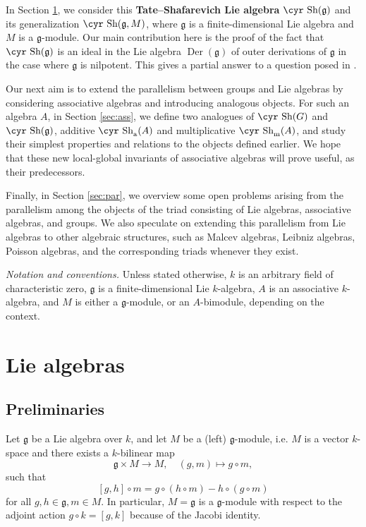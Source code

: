 \documentclass[11pt,reqno]{amsart}
\numberwithin{equation}{section}
\theoremstyle{definition}
\newcommand{\Der}{{\operatorname{ Der}}}
\def\Sha{\text{\cyr Sh}}
\def\g{\mathfrak g}
\begin{document}
In Section \ref{sec:lie}, we consider this {\bf Tate--Shafarevich Lie algebra} $\Sha (\g)$ and its generalization
$\Sha (\g,M)$, where $\g$ is a finite-dimensional Lie algebra and $M$ is a $\g$-module. Our main contribution here
is the proof of the fact that $\Sha (\g)$ is an ideal in the Lie algebra $\Der (\g)$ of outer derivations of $\g$
in the case where $\g$ is nilpotent. This gives a partial answer to a question posed in \cite{BDV1}.

Our next aim is to extend the parallelism between groups and Lie algebras by considering associative algebras and
introducing analogous objects. For such an algebra $A$, in Section \ref{sec:ass}, we define two analogues of
$\Sha (G)$ and $\Sha (\g)$, additive $\Sha_{\text{\rm{a}}}(A)$ and multiplicative $\Sha_{\text{\rm{m}}}(A)$,
and study their simplest properties and relations to the objects defined earlier. We hope that
these new local-global invariants of associative algebras will prove useful, as their predecessors.

Finally, in Section \ref{sec:par}, we overview some open problems arising from the parallelism
among the objects of the triad consisting of Lie algebras, associative algebras, and groups.
We also speculate on extending this parallelism from Lie algebras to other algebraic structures,
such as Malcev algebras, Leibniz algebras, Poisson algebras, and the corresponding triads whenever
they exist.

\medskip

\noindent
{\it Notation and conventions.}
Unless stated otherwise, $k$ is an arbitrary field of
characteristic zero,
$\g$ is a finite-dimensional Lie $k$-algebra,
$A$ is an associative $k$-algebra, and
$M$ is either a $\g$-module, or an $A$-bimodule,
depending on the context.


\section{Lie algebras} \label{sec:lie}

\subsection{Preliminaries} \label{subsec:lie-prelim}
Let $\g$ be a Lie algebra over $k$, and let $M$ be a (left) $\g$-module, i.e. $M$ is a vector $k$-space
and there exists a $k$-bilinear map
$$
\g\times M \to M, \quad (g,m)\mapsto g\circ m,
$$
such that
$$
[g,h]\circ m = g\circ (h\circ m) - h\circ (g\circ m)
$$
for all $g,h\in \g, m\in M$. In particular, $M=\g$
is a $\g$-module with respect to the adjoint action $g\circ k=[g,k]$
because of the Jacobi identity.
\end{document}
